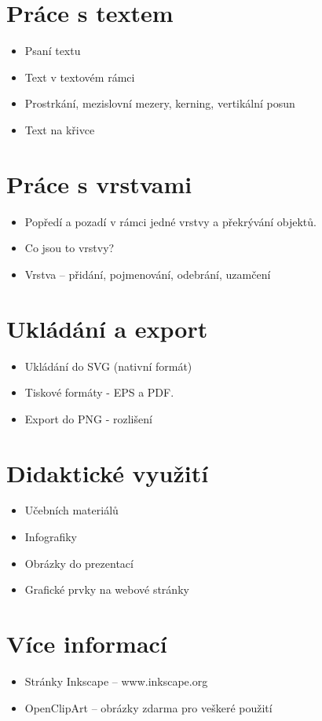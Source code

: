 \documentclass[12pt,a4paper]{article}
\begin{document}
\section{Práce s textem}
	
\begin{itemize}
		\item Psaní textu
		\item Text v textovém rámci
		\item Prostrkání, mezislovní mezery, kerning, vertikální posun
		\item Text na křivce
\end{itemize}	

\section{Práce s vrstvami}
\begin{itemize}
	\item Popředí a pozadí v rámci jedné vrstvy a překrývání objektů.
	\item Co jsou to vrstvy?
	\item Vrstva -- přidání, pojmenování, odebrání, uzamčení
\end{itemize}	

\section{Ukládání a export}
\begin{itemize}
	\item Ukládání do SVG (nativní formát)
	\item Tiskové formáty - EPS a PDF.
	\item Export do PNG - rozlišení
\end{itemize}

\section{Didaktické využití}
	
\begin{itemize}
	\item Učebních materiálů
	\item Infografiky
	\item Obrázky do prezentací
	\item Grafické prvky na webové stránky
\end{itemize}	

\section{Více informací}
\begin{itemize}
	\item Stránky Inkscape -- www.inkscape.org
	\item OpenClipArt -- obrázky zdarma pro veškeré použití
\end{itemize}
\end{document}
